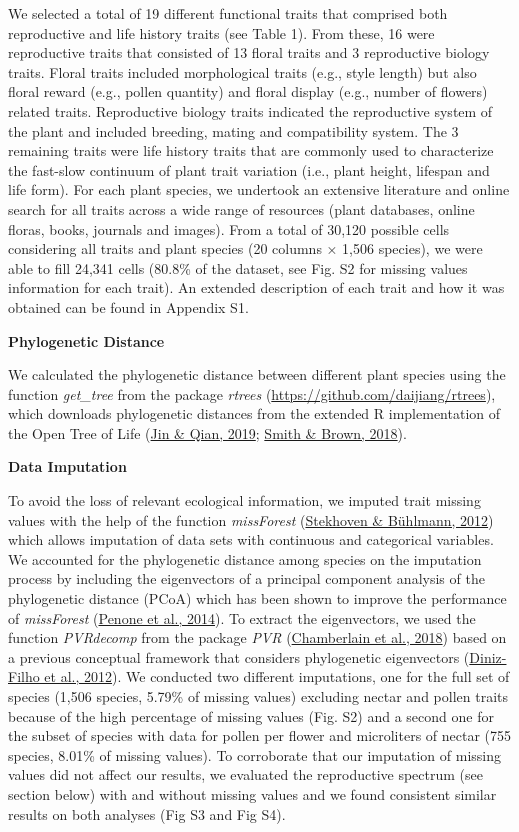 \documentclass[
  12pt,
  a4paper,
]{article}
\begin{document}
We selected a total of 19 different functional traits that comprised both reproductive and life history traits (see Table 1). From these, 16 were reproductive traits that consisted of 13 floral traits and 3 reproductive biology traits. Floral traits included morphological traits (e.g., style length) but also floral reward (e.g., pollen quantity) and floral display (e.g., number of flowers) related traits. Reproductive biology traits indicated the reproductive system of the plant and included breeding, mating and compatibility system. The 3 remaining traits were life history traits that are commonly used to characterize the fast-slow continuum of plant trait variation (i.e., plant height, lifespan and life form). For each plant species, we undertook an extensive literature and online search for all traits across a wide range of resources (plant databases, online floras, books, journals and images). From a total of 30,120 possible cells considering all traits and plant species (20 columns × 1,506 species), we were able to fill 24,341 cells (80.8\% of the dataset, see Fig. S2 for missing values information for each trait). An extended description of each trait and how it was obtained can be found in Appendix S1.

\textbf{Phylogenetic Distance}

We calculated the phylogenetic distance between different plant species using the function \emph{get\_tree} from the package \emph{rtrees} (\url{https://github.com/daijiang/rtrees}), which downloads phylogenetic distances from the extended R implementation of the Open Tree of Life (\protect\hyperlink{ref-jin2019}{Jin \& Qian, 2019}; \protect\hyperlink{ref-smith2018}{Smith \& Brown, 2018}).

\textbf{Data Imputation}

To avoid the loss of relevant ecological information, we imputed trait missing values with the help of the function \emph{missForest} (\protect\hyperlink{ref-stekhoven2012}{Stekhoven \& Bühlmann, 2012}) which allows imputation of data sets with continuous and categorical variables. We accounted for the phylogenetic distance among species on the imputation process by including the eigenvectors of a principal component analysis of the phylogenetic distance (PCoA) which has been shown to improve the performance of \emph{missForest} (\protect\hyperlink{ref-penone2014}{Penone et al., 2014}). To extract the eigenvectors, we used the function \emph{PVRdecomp} from the package \emph{PVR} (\protect\hyperlink{ref-santos2018}{Chamberlain et al., 2018}) based on a previous conceptual framework that considers phylogenetic eigenvectors (\protect\hyperlink{ref-diniz-filho2012}{Diniz-Filho et al., 2012}). We conducted two different imputations, one for the full set of species (1,506 species, 5.79\% of missing values) excluding nectar and pollen traits because of the high percentage of missing values (Fig. S2) and a second one for the subset of species with data for pollen per flower and microliters of nectar (755 species, 8.01\% of missing values). To corroborate that our imputation of missing values did not affect our results, we evaluated the reproductive spectrum (see section below) with and without missing values and we found consistent similar results on both analyses (Fig S3 and Fig S4).
\end{document}

